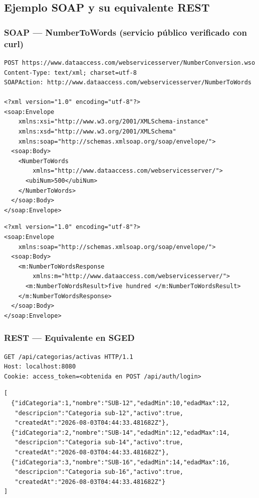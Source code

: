 \documentclass[12pt,a4paper]{article}
\begin{document}
\subsection{Ejemplo SOAP y su equivalente REST}

\subsubsection{SOAP --- NumberToWords (servicio público verificado con curl)}

\begin{lstlisting}[style=xml, caption={Request SOAP --- POST NumberToWords}]
POST https://www.dataaccess.com/webservicesserver/NumberConversion.wso
Content-Type: text/xml; charset=utf-8
SOAPAction: http://www.dataaccess.com/webservicesserver/NumberToWords

<?xml version="1.0" encoding="utf-8"?>
<soap:Envelope
    xmlns:xsi="http://www.w3.org/2001/XMLSchema-instance"
    xmlns:xsd="http://www.w3.org/2001/XMLSchema"
    xmlns:soap="http://schemas.xmlsoap.org/soap/envelope/">
  <soap:Body>
    <NumberToWords
        xmlns="http://www.dataaccess.com/webservicesserver/">
      <ubiNum>500</ubiNum>
    </NumberToWords>
  </soap:Body>
</soap:Envelope>
\end{lstlisting}

\begin{lstlisting}[style=xml, caption={Response SOAP --- captura real}]
<?xml version="1.0" encoding="utf-8"?>
<soap:Envelope
    xmlns:soap="http://schemas.xmlsoap.org/soap/envelope/">
  <soap:Body>
    <m:NumberToWordsResponse
        xmlns:m="http://www.dataaccess.com/webservicesserver/">
      <m:NumberToWordsResult>five hundred </m:NumberToWordsResult>
    </m:NumberToWordsResponse>
  </soap:Body>
</soap:Envelope>
\end{lstlisting}

\subsubsection{REST --- Equivalente en SGED}

\begin{lstlisting}[style=json, caption={Request REST --- GET /api/categorias/activas}]
GET /api/categorias/activas HTTP/1.1
Host: localhost:8080
Cookie: access_token=<obtenida en POST /api/auth/login>
\end{lstlisting}

\begin{lstlisting}[style=json, caption={Response REST --- array JSON directo (sin envoltorio), captura real}]
[
  {"idCategoria":1,"nombre":"SUB-12","edadMin":10,"edadMax":12,
   "descripcion":"Categoria sub-12","activo":true,
   "createdAt":"2026-08-03T04:44:33.481682Z"},
  {"idCategoria":2,"nombre":"SUB-14","edadMin":12,"edadMax":14,
   "descripcion":"Categoria sub-14","activo":true,
   "createdAt":"2026-08-03T04:44:33.481682Z"},
  {"idCategoria":3,"nombre":"SUB-16","edadMin":14,"edadMax":16,
   "descripcion":"Categoria sub-16","activo":true,
   "createdAt":"2026-08-03T04:44:33.481682Z"}
]
\end{lstlisting}
\end{document}
